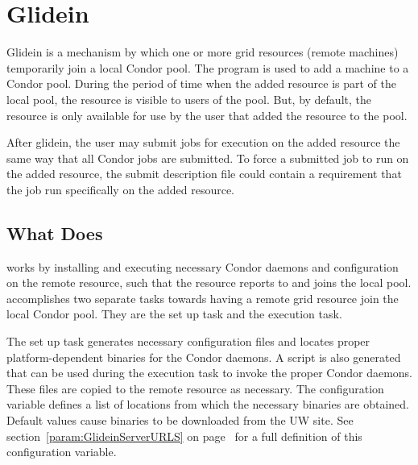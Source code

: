 \section{\label{sec:Glidein}Glidein}

Glidein is a mechanism by which one or more grid resources (remote machines)
temporarily join a local Condor pool. 
The program  is used to add a machine
to a Condor pool.
During the period of time when the added resource is
part of the local pool, the resource is visible 
to users of the pool.
But, by default, the resource is only available for
use by the user
that added the resource to the pool.

After glidein, the user may submit jobs for execution on the
added resource the same way that all Condor jobs are submitted.
To force a submitted job to run on the added resource, the
submit description file could contain a requirement that the job run 
specifically on the added resource.


\subsection{What  Does}

 works by installing and executing
necessary Condor daemons and configuration on the remote resource,
such that the resource reports to and joins the local pool.
 accomplishes two separate tasks towards
having a remote grid resource join the local Condor pool.
They are the set up task and the execution task.

The set up task generates necessary 
configuration files and locates proper platform-dependent
binaries for the Condor daemons.
A script is also generated that can be used during
the execution task to invoke the proper Condor daemons.
These files are copied to the remote resource as necessary.
The configuration variable 
defines a list of locations from which the necessary
binaries are obtained.
Default values cause binaries to be downloaded from the 
UW site.
See 
section~\ref{param:GlideinServerURLS} 
on page~\pageref{param:GlideinServerURLS}
for a full definition of this configuration variable.

